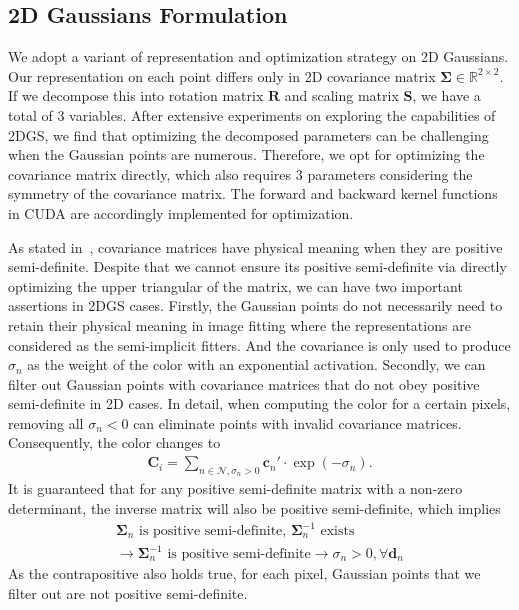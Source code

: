 \subsection{2D Gaussians Formulation}
We adopt a variant of representation and optimization strategy on 2D Gaussians. Our representation on each point differs only in 2D covariance matrix $\bm \Sigma \in \mathbb{R}^{2\times 2}$. If we decompose this into rotation matrix $\bm R$ and scaling matrix $\bm S$, we have a total of 3 variables. After extensive experiments on exploring the capabilities of 2DGS, we find that optimizing the decomposed parameters can be challenging when the Gaussian points are numerous. Therefore, we opt for optimizing the covariance matrix directly, which also requires 3 parameters considering the symmetry of the covariance matrix. The forward and backward kernel functions in CUDA are accordingly implemented for optimization.

As stated in~\cite{kerbl20233d}, covariance matrices have physical meaning when they are positive semi-definite. Despite that we cannot ensure its positive semi-definite via directly optimizing the upper triangular of the matrix, we can have two important assertions in 2DGS cases. Firstly, the Gaussian points do not necessarily need to retain their physical meaning in image fitting where the representations are considered as the semi-implicit fitters. And the covariance is only used to produce $\sigma_n$ as the weight of the color with an exponential activation. Secondly, we can filter out Gaussian points with covariance matrices that do not obey positive semi-definite in 2D cases. In detail, when computing the color for a certain pixels, removing all $\sigma_n < 0$ can eliminate points with invalid covariance matrices. Consequently, the color changes to 
\begin{equation}
  \begin{aligned}
    \boldsymbol{C}_i = \sum_{n \in \mathcal{N}, \sigma_n > 0} \boldsymbol{c}_n' \cdot \exp(-\sigma_n).
  \end{aligned}
\end{equation}
%
It is guaranteed that for any positive semi-definite matrix with a non-zero determinant, the inverse matrix will also be positive semi-definite, which implies
\begin{equation}
  \begin{aligned}
\boldsymbol{\Sigma}_n \text{ is positive semi-definite, } \boldsymbol{\Sigma}_n^{-1} \text{ exists} \\ \rightarrow \boldsymbol{\Sigma}_n^{-1} \text{ is positive semi-definite} \rightarrow \sigma_n > 0, \forall \boldsymbol{d}_n
  \end{aligned}
\end{equation}
As the contrapositive also holds true, for each pixel, Gaussian points that we filter out are not positive semi-definite.

